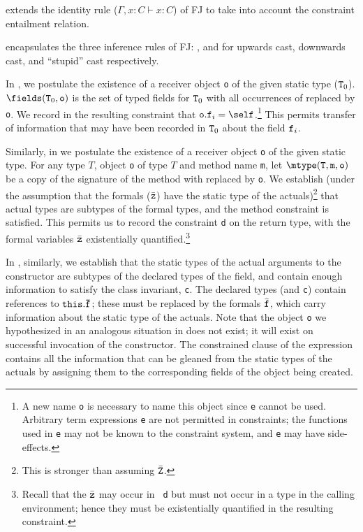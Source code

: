 \TVar{} extends the identity rule ($\Gamma, x:C \vdash x:C$) of {\sf FJ} to take into account the constraint entailment relation.

\TCast{} encapsulates the three inference rules of {\sf FJ}:
\TUCast{}, \TDCast{} and \TSCast{} for upwards cast, downwards cast, and ``stupid'' cast respectively. 


In \TField, we postulate the existence of a receiver object {\tt o} of
the given static type (${\tt T}_0$). $\fields({\tt T}_0,{\tt o})$ is
the set of typed fields for ${\tt T}_0$ with all occurrences of 
\this{} replaced  by {\tt o}. We record in the resulting
constraint that ${\tt o.f}_i=\self$.\footnote{A new name {\tt o} is
necessary to name this object since {\tt e} cannot be used. Arbitrary
term expressions {\tt e} are not permitted in constraints; the
functions used in {\tt e} may not be known to the constraint system,
and {\tt e} may have side-effects.}  This permits transfer of
information that may have been recorded in ${\tt T}_0$ about the field
${\tt f}_i$. 

Similarly, in \TInvk{} we postulate the existence of a receiver object
{\tt o} of the given static type. For any type $T$, object {\tt o} of
type $T$ and method name {\tt m}, let $\mtype({\tt T},{\tt m},{\tt
o})$ be a copy of the signature of the method with \this{} replaced by
{\tt o}. We establish (under the assumption that the formals
($\bar{\tt z}$) have the static type of the actuals)\footnote{This is
stronger than assuming $\bar{\tt Z}$.}  that actual types are subtypes
of the formal types, and the method constraint is satisfied. This
permits us to record the constraint {\tt d} on the return type, with
the formal variables $\bar{\tt z}$ existentially
quantified.\footnote{Recall that the $\bar{\tt z}$ may occur in {\tt
d} but must not occur in a type in the calling environment; hence they
must be existentially quantified in the resulting constraint.}

In \TNew, similarly, we establish that the static types of the actual
arguments to the constructor are subtypes of the declared types of the
field, and contain enough information to satisfy the class invariant,
{\tt c}. The declared types (and {\tt c}) contain references to ${\tt
this.\bar{\tt f}}$; these must be replaced by the formals $\bar{\tt
f}$, which carry information about the static type of the
actuals. Note that the object {\tt o} we hypothesized in an analogous
situation in \TInvk{} does not exist; it will exist on successful
invocation of the constructor. The constrained clause of the \new{}
expression contains all the information that can be gleaned from the
static types of the actuals by assigning them to the corresponding
fields of the object being created.

